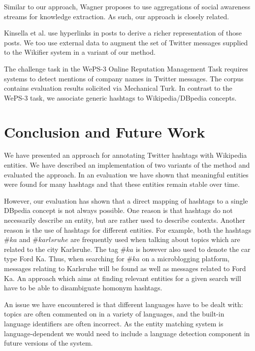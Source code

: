 \documentclass{llncs}
\begin{document}
Similar to our approach, Wagner \cite{key:clauwa} proposes to use aggregations of social awareness streams for knowledge extraction. As such, our approach is closely related.

Kinsella et al. \cite{key:kinsella} use hyperlinks in posts to derive a richer representation of those posts. We too use external data to augment the set of Twitter messages supplied to the Wikifier system in a variant of our method.

The challenge task in the WePS-3 Online Reputation Management Task\cite{key:clef} requires systems to detect mentions of company names in Twitter messages.
The corpus contains evaluation results solicited via Mechanical Turk. In contrast to the WePS-3 task, we associate generic hashtags to Wikipedia/DBpedia concepts.


\section{Conclusion and Future Work}
\label{sect:conclusion}

We have presented an approach for annotating Twitter hashtags with Wikipedia entities.
We have described an implementation of two variants of the method and evaluated the approach. In an evaluation we have shown that meaningful entities were found for many hashtags and that these entities remain stable over time.

However, our evaluation has shown that a direct mapping of hashtags to a single DBpedia concept is not always possible.
One reason is that hashtags do not necessarily describe an entity, but are rather used to describe contexts.
Another reason is the use of hashtags for different entities.
For example, both the hashtags $\#ka$ and $\#karlsruhe$ are frequently used when talking about topics which are related to the city Karlsruhe.
The tag $\#ka$ is however also used to denote the car type Ford Ka.
Thus, when searching for $\#ka$ on a microblogging platform, messages relating to Karlsruhe will be found as well as messages related to Ford Ka.
An approach which aims at finding relevant entities for a given search will have to be able to disambiguate homonym hashtags.

An issue we have encountered is that different languages have to be dealt with: topics are often commented on in a variety of languages, and the built-in language identifiers are often incorrect.
As the entity matching system is language-dependent we would need to include a language detection component in future versions of the system.






\end{document}
